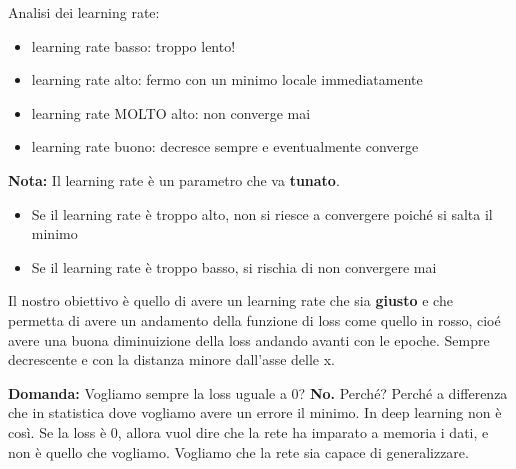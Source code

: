 
Analisi dei learning rate:
\begin{itemize}
    \item learning rate basso: troppo lento!
    \item learning rate alto: fermo con un minimo locale immediatamente
    \item learning rate MOLTO alto: non converge mai
    \item learning rate buono: decresce sempre e eventualmente converge
\end{itemize}

\textbf{Nota:} Il learning rate è un parametro che va \textbf{tunato}.
\begin{itemize}
    \item Se il learning rate è troppo alto, non si riesce a convergere poiché si salta
          il minimo
    \item Se il learning rate è troppo basso, si rischia di non convergere mai
\end{itemize}

Il nostro obiettivo è quello di avere un learning rate che sia \textbf{giusto}
e che permetta di avere un andamento della funzione di loss come quello in
rosso, cioé avere una buona diminuizione della loss andando avanti con le
epoche. Sempre decrescente e con la distanza minore dall'asse delle x.

\textbf{Domanda:} Vogliamo sempre la loss uguale a 0? \textbf{No.}
Perché? Perché a differenza che in statistica dove vogliamo avere un errore il minimo.
In deep learning non è così. Se la loss è 0, allora vuol dire che la rete ha
imparato a memoria i dati, e non è quello che vogliamo. Vogliamo che la rete
sia capace di generalizzare.


